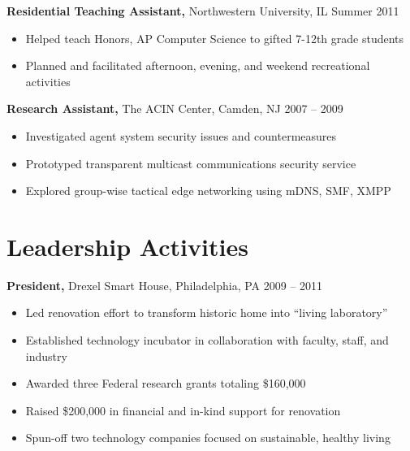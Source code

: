 \documentclass[margin]{res}
\begin{document}
\begin{resume}
 {\bf Residential Teaching Assistant,} Northwestern University, IL \hfill Summer 2011
 \begin{itemize} \itemsep -2pt  %
  \item Helped teach Honors, AP Computer Science to gifted 7-12th grade students
  \item Planned and facilitated afternoon, evening, and weekend recreational activities 
 \end{itemize}

 {\bf Research Assistant,} The ACIN Center, Camden, NJ \hfill 2007 -- 2009
 \begin{itemize} \itemsep -2pt  %
 \item Investigated agent system security issues and countermeasures 
 \item Prototyped transparent multicast communications security service 
\item Explored group-wise tactical edge networking using mDNS, SMF, XMPP 
 \end{itemize}


\section{Leadership  Activities} 
     {\bf President,} Drexel Smart House, Philadelphia, PA \hfill 2009 -- 2011 %
     \begin{itemize} \itemsep -2pt
     \item Led renovation effort to transform historic home into ``living laboratory''
     \item Established technology incubator in collaboration with faculty, staff, and industry
     \item Awarded three Federal research grants totaling \$160,000
     \item Raised \$200,000 in financial and in-kind support for renovation
	\item Spun-off two technology companies focused on sustainable, healthy living
	\end{itemize}


\end{resume}
\end{document}
